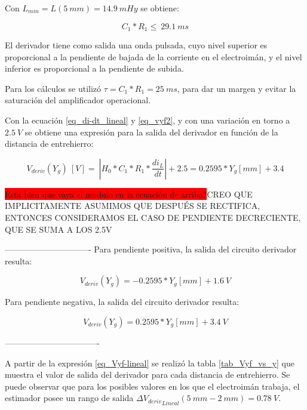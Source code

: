 Con $L_{min}= L(5\: mm) = 14.9\: mHy$ se obtiene: 

\begin{equation} \label{eq_condicionC1-R1-2}
	C_1*R_1\le\ 29.1\ ms
\end{equation}

El derivador tiene como salida una onda pulsada, cuyo nivel superior es proporcional a la pendiente de bajada de la corriente en el electroimán, y el nivel inferior es proporcional a la pendiente de subida.

Para los cálculos se utilizó $\tau = C_1*R_1= 25\:ms$, para dar un margen y evitar la saturación del amplificador operacional.  

Con la ecuación \ref{eq_di-dt_lineal} y \ref{eq_vyf2}, y con una variación en torno a $2.5\:V$ se obtiene una expresión para la salida del derivador en función de la distancia de entrehierro:


\begin{equation} \label{eq_Vyf-lineal}
	V_{deriv}(Y_g)\:[V] =\ |H_0*C_1*R_1*\frac{di_L}{dt}| +2.5=0.2595*Y_g[mm]+3.4
\end{equation}

\colorbox{red}{Esta bien que vaya el modulo en la ecuación de arriba?}CREO QUE IMPLICITAMENTE ASUMIMOS QUE DESPUÉS SE RECTIFICA, ENTONCES CONSIDERAMOS EL CASO DE PENDIENTE DECRECIENTE, QUE SE SUMA A LOS 2.5V

-------------------------------
Para pendiente positiva, la salida del circuito derivador resulta:

\begin{equation} %
	V_{deriv}(Y_g) = -0.2595*Y_g[mm] + 1.6\:V
\end{equation}


Para pendiente negativa, la salida del circuito derivador resulta:

\begin{equation} %
	V_{deriv}(Y_g) = 0.2595*Y_g[mm] + 3.4\:V
\end{equation}

----------------------------------

A partir de la expresión \ref{eq_Vyf-lineal} se realizó la tabla \ref{tab_Vyf_vs_y} que muestra el valor de salida del derivador para cada distancia de entrehierro. Se puede observar  que para los posibles valores en los que el electroimán trabaja, el estimador posee un rango de salida ${\mathit{\Delta}{V_{deriv}}_{Lineal}}(5\:mm-2\:mm)= 0.78\:V$.

